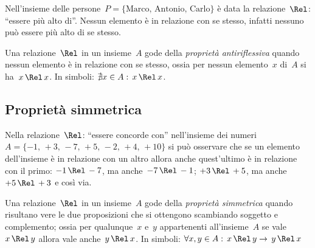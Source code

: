 \begin{exrig}
 \begin{esempio}
Nell'insieme delle persone~$P = \{\text{Marco, Antonio, Carlo}\}$ è data la relazione~$\Rel$: ``essere più alto di''. Nessun elemento è in relazione con se stesso, infatti nessuno può essere più alto di se stesso.
 \end{esempio}
\end{exrig}

\begin{definizione}
Una relazione~$\Rel$ in un insieme~$A$ gode della \emph{proprietà antiriflessiva} quando nessun elemento è in relazione con se stesso,
ossia per nessun elemento~$x$ di~$A$ si ha~$x \,\Rel\, x$.
In simboli: $\nexists x \in A:\, x \,\Rel\, x$.
\end{definizione}

\ovalbox{\risolvi \ref{ese:\thechapter.19}}
\subsection{Proprietà simmetrica}

\begin{exrig}
 \begin{esempio}
Nella relazione~$\Rel$: ``essere concorde con'' nell'insieme dei numeri~$A = \{-1\text{, }+3\text{, }-7\text{, }+5\text{, }-2\text{, }+4\text{, }+10\}$ si può osservare che se un elemento dell'insieme è in relazione con un altro allora anche quest'ultimo è in relazione con il primo:
$-1 \,\Rel\, -7$, ma anche~$-7 \,\Rel\, -1$; $+3 \,\Rel\, +5$, ma anche~$+5 \,\Rel\, +3$ e così via.
 \end{esempio}
\end{exrig}

% 
% 

\begin{definizione}
Una relazione~$\Rel$ in un insieme~$A$ gode della \emph{proprietà simmetrica} quando risultano vere le due proposizioni
che si ottengono scambiando soggetto e complemento; ossia per qualunque~$x$ e~$y$ appartenenti all'insieme~$A$ se vale~$x \,\Rel\, y$ allora vale anche~$y \,\Rel\, x$.
In simboli: $\forall x, y \in A:\, x \,\Rel\, y \rightarrow \, y \,\Rel\, x$
\end{definizione}


